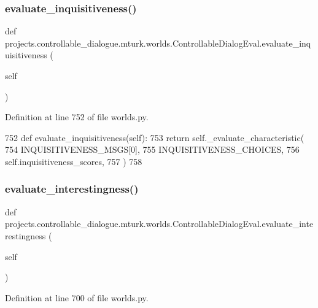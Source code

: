 \subsubsection{\texorpdfstring{evaluate\+\_\+inquisitiveness()}{evaluate\_inquisitiveness()}}
{\footnotesize\ttfamily def projects.\+controllable\+\_\+dialogue.\+mturk.\+worlds.\+Controllable\+Dialog\+Eval.\+evaluate\+\_\+inquisitiveness (\begin{DoxyParamCaption}\item[{}]{self }\end{DoxyParamCaption})}



Definition at line 752 of file worlds.\+py.


\begin{DoxyCode}
752     \textcolor{keyword}{def }evaluate\_inquisitiveness(self):
753         \textcolor{keywordflow}{return} self.\_evaluate\_characteristic(
754             INQUISITIVENESS\_MSGS[0],
755             INQUISITIVENESS\_CHOICES,
756             self.inquisitiveness\_scores,
757         )
758 
\end{DoxyCode}
\mbox{\label{classprojects_1_1controllable__dialogue_1_1mturk_1_1worlds_1_1ControllableDialogEval_a2316627ec10b57561396a38fe3628e2f}} 
\subsubsection{\texorpdfstring{evaluate\+\_\+interestingness()}{evaluate\_interestingness()}}
{\footnotesize\ttfamily def projects.\+controllable\+\_\+dialogue.\+mturk.\+worlds.\+Controllable\+Dialog\+Eval.\+evaluate\+\_\+interestingness (\begin{DoxyParamCaption}\item[{}]{self }\end{DoxyParamCaption})}



Definition at line 700 of file worlds.\+py.



